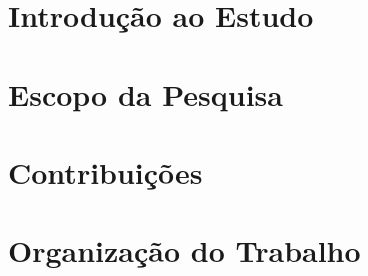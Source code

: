 \newcommand{\comando}[1]{\textbf{$\backslash$#1}}
\vspace{-2cm}
\section{Introdução ao Estudo}


\section{Escopo da Pesquisa}

\section{Contribuições}

\section{Organização do Trabalho}